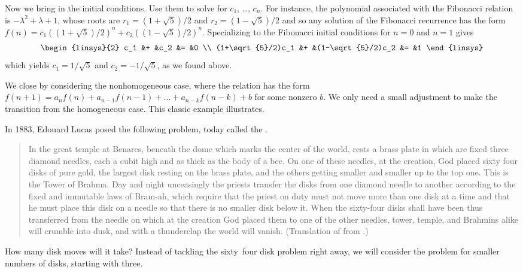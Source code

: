 Now we bring in the initial conditions. 
Use them to solve for $c_1$, \ldots, $c_n$.
For instance, the polynomial associated with the Fibonacci relation is
$-\lambda^2+\lambda+1$, whose roots are $r_1=(1+\sqrt{5})/2$
and $r_2=(1-\sqrt{5})/2$
and so any solution of the Fibonacci recurrence 
has the form $f(n)=c_1((1+\sqrt{5})/2)^n+c_2((1-\sqrt{5})/2)^n$.
Specializing to the Fibonacci initial conditions for $n=0$ and $n=1$ gives
\begin{equation*}
  \begin{linsys}{2}
    c_1               &+  &c_2               &=  &0  \\
    (1+\sqrt{5}/2)c_1 &+  &(1-\sqrt{5}/2)c_2 &=  &1
  \end{linsys}
\end{equation*}
which yields $c_1=1/\sqrt{5}$ and $c_2=-1/\sqrt{5}$, as we found above.

We close by considering the nonhomogeneous case,
where the relation has the form
$f(n+1)=a_nf(n)+a_{n-1}f(n-1)+\dots+a_{n-k}f(n-k)+b$ for some nonzero $b$.
We only need a small adjustment
to make the transition from the homogeneous case.
This classic example illustrates.

In 1883, Edouard Lucas posed the following problem,
today called the .
\begin{quotation}
  \noindent
  In the great temple at Benares, beneath the dome which marks the center 
  of the world, rests a brass plate in which are fixed three diamond needles,
  each a cubit high and as thick as the body of a bee.
  On one of these needles, at the creation,
  God placed sixty four disks of pure gold, the largest disk resting on 
  the brass plate, and the others getting smaller and smaller up to the
  top one.
  This is the Tower of Brahma.
  Day and night unceasingly the priests transfer the disks from one diamond
  needle to another according to the fixed and immutable laws of Bram-ah,
  which require that the priest on duty must not move more than one disk at a 
  time and that he must place this disk on a needle so that there is no
  smaller disk below it.
  When the sixty-four disks shall have been thus transferred from the needle
  on which at the creation God placed them to one of the other needles,
  tower, temple, and Brahmins alike will crumble into dusk, and with
  a thunderclap the world will vanish.
  (Translation of \cite{DeParville} from \cite{Ball}.)
\end{quotation}
How many disk moves will it take?
Instead of tackling the sixty~four disk problem right away, 
we will consider the 
problem for smaller numbers of disks, starting with three.

